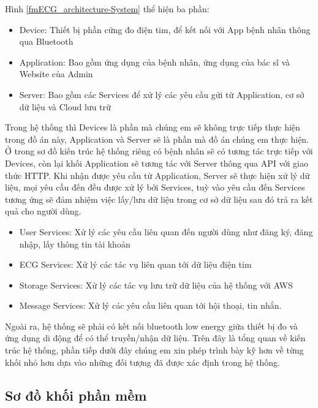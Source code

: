 Hình \ref{fmECG_architecture-System} thể hiện ba phần: 

\begin{adjustwidth}{1.5em}{}
\begin{itemize}
  \item Device: Thiết bị phần cứng đo điện tim, để kết nối với App bệnh nhân thông qua Bluetooth 
  \item Application: Bao gồm ứng dụng của bệnh nhân, ứng dụng của bác sĩ và Website của Admin
  \item Server: Bao gồm các Services để xử lý các yêu cầu gửi từ Application, cơ sở dữ liệu và Cloud lưu trữ
\end{itemize}
\end{adjustwidth}

Trong hệ thống thì Devices là phần mà chúng em sẽ không trực tiếp thực hiện trong đồ án này, Application và Server sẽ là
phần mà đồ án chúng em thực hiện. Ở trong sơ đồ kiến trúc hệ thống riêng có bệnh nhân sẽ có tương tác trực tiếp với Devices,
còn lại khối Application sẽ tương tác với Server thông qua API với giao thức HTTP. Khi nhận được yêu cầu từ Application,
Server sẽ thực hiện xử lý dữ liệu, mọi yêu cầu đến đều được xử lý bởi Services, tuỳ vào yêu cầu đến Services tương ứng sẽ đảm nhiệm 
việc lấy/lưu dữ liệu trong cơ sở dữ liệu sau đó trả ra kết quả cho người dùng.
\begin{adjustwidth}{1.5em}{}
\begin{itemize}
  \item User Services: Xử lý các yêu cầu liên quan đến người dùng như đăng ký, đăng nhập, lấy thông tin tài khoản
  \item ECG Services: Xử lý các tác vụ liên quan tới dữ liệu điện tim
  \item Storage Services: Xử lý các tác vụ lưu trữ dữ liệu của hệ thống với AWS
  \item Message Services: Xử lý các yêu cầu liên quan tới hội thoại, tin nhắn.
\end{itemize}
\end{adjustwidth}
Ngoài ra, hệ thống sẽ phải có kết nối bluetooth low energy giữa thiết bị đo và ứng dụng di động để có thể truyền/nhận dữ liệu.
Trên đây là tổng quan về kiến trúc hệ thống, phần tiếp dưới đây chúng em xin phép trình bày kỹ hơn về từng khối nhỏ hơn
dựa vào những đối tượng đã được xác định trong hệ thống.

\subsection{Sơ đồ khối phần mềm}

